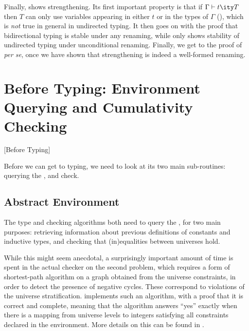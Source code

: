 Finally,  shows strengthening.
Its first important property is that if $\Gamma \vdash t \ity T$ then
$T$ can only use variables appearing in either $t$ or in the types of $\Gamma$
(),
which is \emph{not} true in general in undirected typing.%
It then goes on with the proof that bidirectional typing is stable under any renaming, while
 only shows stability of undirected typing under unconditional renaming.
Finally, we get to the proof of 
\textit{per se}, once we have shown that strengthening is indeed a well-formed renaming.

\section{Before Typing: Environment Querying and Cumulativity Checking}[Before Typing]
\label{sec:kernel-subroutines}

Before we can get to typing, we need to look at its two main sub-routines:
querying the , and  check.

\subsection{Abstract Environment}

The type and  checking algorithms both need to query the ,
for two main purposes: retrieving information about previous definitions of constants and inductive
types, and checking that (in)equalities between universes hold.

While this might seem anecdotal,
a surprisingly important amount of time is spent in the actual checker on the second problem, which
requires a form of shortest-path algorithm on a graph obtained from the universe constraints, in order
to detect the presence of negative cycles.
These correspond to violations of the universe stratification.
 implements such an algorithm, with a proof that it is correct and complete, meaning that
the algorithm answers “yes” exactly when there is a mapping from universe levels to integers satisfying
all constraints declared in the environment.
More details on this can be found in .

